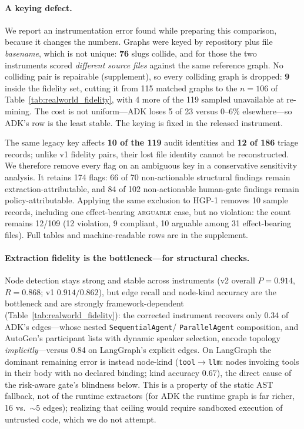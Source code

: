 \paragraph{A keying defect.}
We report an instrumentation error found while preparing this comparison,
because it changes the numbers. Graphs were keyed by repository plus file
\emph{basename}, which is not unique: \textbf{76} slugs collide, and for those
the two instruments scored \emph{different source files} against the same
reference graph. No colliding pair is repairable (supplement), so every
colliding graph is dropped: \textbf{9} inside the fidelity set, cutting it from
115 matched graphs to the $n{=}106$ of Table~\ref{tab:realworld_fidelity}, with
4 more of the 119 sampled unavailable at re-mining. The cost is not
uniform---ADK loses 5 of 23 versus 0--6\% elsewhere---so ADK's row is the least
stable. The keying is fixed in the released instrument.

The same legacy key affects \textbf{10 of the 119} audit identities and
\textbf{12 of 186} triage records; unlike v1 fidelity pairs, their lost file
identity cannot be reconstructed. We therefore remove every flag on an
ambiguous key in a conservative sensitivity analysis. It retains 174 flags:
66 of 70 non-actionable structural findings remain extraction-attributable,
and 84 of 102 non-actionable human-gate findings remain policy-attributable.
Applying the same exclusion to HGP-1 removes 10 sample records, including one
effect-bearing \textsc{arguable} case, but no violation: the count remains
12/109 (12 violation, 9 compliant, 10 arguable among 31 effect-bearing files).
Full tables and machine-readable rows are in the supplement.

\paragraph{Extraction fidelity is the bottleneck---for structural checks.}
Node detection stays strong and stable across instruments (v2 overall
$P{=}0.914$, $R{=}0.868$; v1 $0.914/0.862$), but edge recall and node-kind
accuracy are the bottleneck and are strongly framework-dependent
(Table~\ref{tab:realworld_fidelity}): the corrected instrument recovers only
0.34 of ADK's edges---whose nested \texttt{SequentialAgent}/
\texttt{ParallelAgent} composition, and AutoGen's participant lists with dynamic
speaker selection, encode topology \emph{implicitly}---versus 0.84 on LangGraph's
explicit edges. On LangGraph the dominant remaining error is instead
node-kind (\texttt{tool}$\rightarrow$\texttt{llm}: nodes invoking tools in their
body with no declared binding; kind accuracy 0.67), the direct cause of the
risk-aware gate's blindness below. This is a property of the static AST
fallback, not of the runtime extractors (for ADK the runtime graph is far
richer, 16 vs.\ ${\sim}5$ edges); realizing that ceiling would require sandboxed
execution of untrusted code, which we do not attempt.

